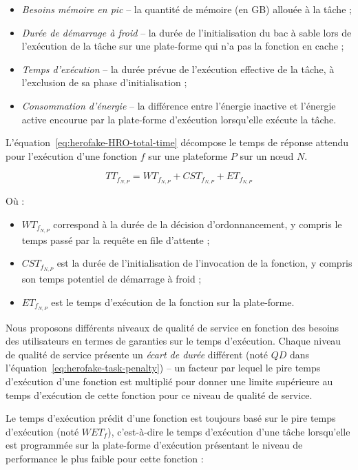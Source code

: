 \begin{itemize}
    \item \textit{Besoins mémoire en pic} -- la quantité de mémoire (en GB) allouée à la tâche ;
    \item \textit{Durée de démarrage à froid} -- la durée de l'initialisation du bac à sable lors de l'exécution de la tâche sur une plate-forme qui n'a pas la fonction en cache ;
    \item \textit{Temps d'exécution} -- la durée prévue de l'exécution effective de la tâche, à l'exclusion de sa phase d'initialisation ;
    \item \textit{Consommation d'énergie} -- la différence entre l'énergie inactive et l'énergie active encourue par la plate-forme d'exécution lorsqu'elle exécute la tâche.
\end{itemize}

L'équation~\ref{eq:herofake-HRO-total-time} décompose le temps de réponse attendu pour l'exécution d'une fonction $f$ sur une plateforme $P$ sur un nœud $N$.

\begin{equation}
    {TT}_{{f}_{N, P}} = {WT}_{{f}_{N, P}} + {CST}_{{f}_{N, P}} + {ET}_{{f}_{N, P}}
\label{eq:herofake-HRO-total-time}
\end{equation}

Où :

\begin{itemize}
    \item ${WT}_{{f}_{N, P}}$ correspond à la durée de la décision d'ordonnancement, y compris le temps passé par la requête en file d'attente ;
    \item ${CST}_{{f}_{N, P}}$ est la durée de l'initialisation de l'invocation de la fonction, y compris son temps potentiel de démarrage à froid ;
    \item ${ET}_{{f}_{N, P}}$ est le temps d'exécution de la fonction sur la plate-forme.
\end{itemize}

Nous proposons différents niveaux de qualité de service en fonction des besoins des utilisateurs en termes de garanties sur le temps d'exécution. Chaque niveau de qualité de service présente un \textit{écart de durée} différent (noté $QD$ dans l'équation~\ref{eq:herofake-task-penalty}) -- un facteur par lequel le pire temps d'exécution d'une fonction est multiplié pour donner une limite supérieure au temps d'exécution de cette fonction pour ce niveau de qualité de service.

Le temps d'exécution prédit d'une fonction est toujours basé sur le pire temps d'exécution (noté $WET_{f}$), c'est-à-dire le temps d'exécution d'une tâche lorsqu'elle est programmée sur la plate-forme d'exécution présentant le niveau de performance le plus faible pour cette fonction :


